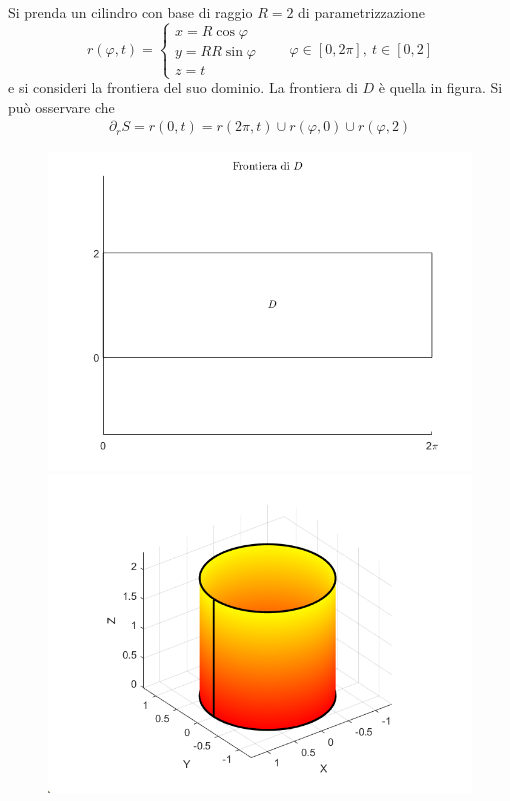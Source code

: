  \begin{example}
     Si prenda un cilindro con base di raggio $R=2$ di parametrizzazione
     \begin{equation*}
         r(\varphi,t)=\begin{cases}
             x= R \cos \varphi\\
             y= R R \sin \varphi\\
             z=t
         \end{cases}
         \qquad \varphi \in [0, 2\pi],\ t \in [0, 2]
     \end{equation*}
     e si consideri la frontiera del suo dominio.
     La frontiera di $D$ è quella in figura. Si può osservare che
     \begin{align*}
         \partial_r S = r(0,t) = r(2\pi, t) \cup r(\varphi, 0) \cup r(\varphi, 2)
     \end{align*}
     \begin{figure}[H]
     \begin{minipage}{0.4\textwidth}
     \includegraphics[width=\textwidth]{Capitoli/Capitolo6/Frontiera D.png}
     \end{minipage}
     \centering
     \begin{minipage}{0.5\textwidth}
     \includegraphics[width=\textwidth]{Capitoli/Capitolo6/Bordo parametrico cilindro.png}

\end{minipage}
\end{figure}
\end{example}
